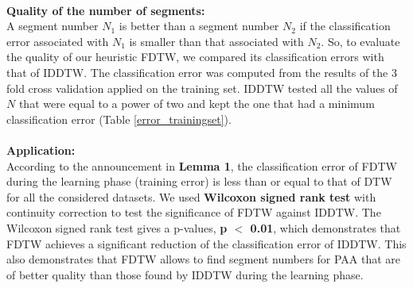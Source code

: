  \paragraph{}\textbf{Quality of the number of segments:}   \\
 A segment number $N_1$ is better than a segment number $N_2$ if the classification
 error associated with $N_1$ is smaller than that associated with $N_2$. So, to evaluate the
 quality of our heuristic FDTW, we compared its classification errors with that of IDDTW.
  The classification error  was computed from the results of the 3 fold cross validation 
  applied on the training set. IDDTW tested all the values of $N$ that were equal to a power of two and kept the one that had  a minimum
classification error (Table \ref{error_trainingset}).



 \paragraph{}\textbf{Application:}  \\
According to the announcement in \textbf{Lemma 1}, the classification error of FDTW during the learning phase (training error) is less
than or equal to that of DTW for all the considered datasets.  We used \textbf{Wilcoxon signed rank test} with continuity
correction to test the significance of FDTW against IDDTW.  The Wilcoxon signed rank test gives a
p-values, \textbf{ p $<$ 0.01}, which demonstrates that FDTW achieves a
significant reduction of the classification error of IDDTW. This also demonstrates that FDTW allows
to find segment numbers for PAA that are of better quality than those found by IDDTW during the learning phase.

